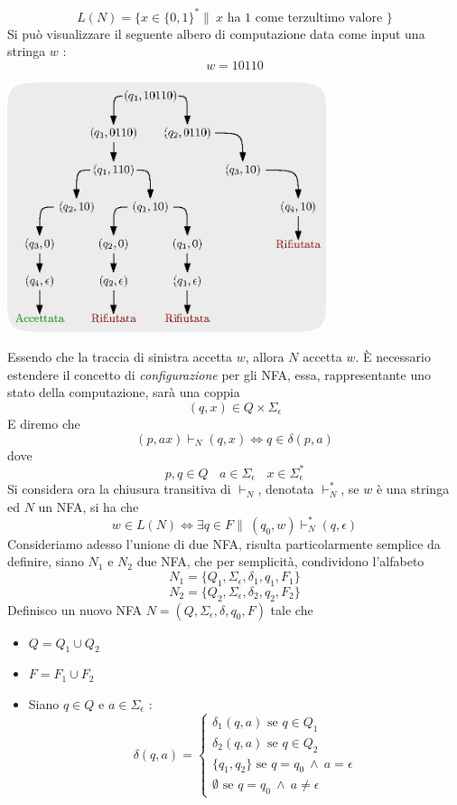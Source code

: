 \documentclass[10pt, letterpaper]{report}
\begin{document}
$$ L(N)=\{x\in\{0,1\}^*\|\ x\text{ ha $1$ come terzultimo valore }\}$$
Si può visualizzare il seguente albero di computazione data come input una stringa $w$ :
$$w=10110$$\begin{center}
    \includegraphics[width=0.7\textwidth ]{images/alberoCalc.eps}
\end{center}
Essendo che la traccia di sinistra accetta $w$, allora $N$ accetta $w$.\acc 
È necessario estendere il concetto di \textit{configurazione} per gli NFA, essa, rappresentante 
uno stato della computazione, sarà una coppia 
$$ (q,x)\in Q\times \Sigma_\epsilon$$
E diremo che 
$$ (p,ax)\vdash_N (q,x)\iff q\in \delta(p,a)$$
dove 
$$p,q\in Q \ \ \ \ a\in \Sigma_\epsilon\ \ \ \ x\in \Sigma_\epsilon^*$$
Si considera ora la chiusura transitiva di $\vdash_N$, denotata $\vdash_N^*$, se $w$ è una stringa ed 
$N$ un NFA, si ha che 
$$ w\in L(N)\iff \exists q\in F \|\ (q_0,w)\vdash_N^* (q,\epsilon)$$
Consideriamo adesso l'unione di due NFA, risulta particolarmente semplice da definire, siano $N_1$ e $N_2$ due 
NFA, che per semplicità, condividono l'alfabeto 
$$ 
N_1=\{Q_1,\Sigma_\epsilon,\delta_1,q_1,F_1\}
$$$$ 
N_2=\{Q_2,\Sigma_\epsilon,\delta_2,q_2,F_2\}
$$
Definisco un nuovo NFA $N=(Q,\Sigma_\epsilon,\delta,q_0,F)$ tale che \begin{itemize}
    \item $Q=Q_1\cup Q_2$
    \item $F=F_1\cup F_2$
    \item Siano $q\in Q$ e $a\in\Sigma_\epsilon$ : 
    $$ 
        \delta(q,a)=\begin{cases}
            \delta_1(q,a) \text{ se }q\in Q_1\\
            \delta_2(q,a) \text{ se }q\in Q_2\\
            \{q_1,q_2\} \text{ se }q=q_0  \ \land\ a=\epsilon \\
            \emptyset \text{ se }q=q_0\ \land \ a\ne \epsilon 
        \end{cases}
    $$
\end{itemize}
\end{document}
